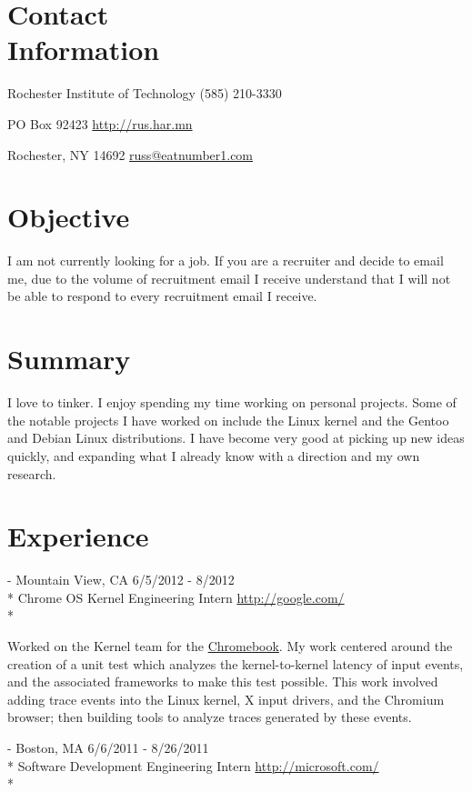 \documentclass[a4paper,margin,line]{resume}
\newcommand{\rurl}[1]{\hfill {\footnotesize \url{#1}}}
\newcommand{\rdate}[1]{\hfill {\small #1}}
\renewcommand{\employer}[5]{\item[#1] - #2 \rdate{#3} \\* #4 \rurl{#5} \\*}
\begin{document}
\begin{resume}
\section{\mysidestyle Contact \\ Information} \vspace{2mm}
	\begin{asparablank}
		\item Rochester Institute of Technology \hfill (585) 210-3330
		\item PO Box 92423 \hfill \href{http://rus.har.mn/}{http://rus.har.mn}
		\item Rochester, NY 14692 \hfill \href{mailto:russ@eatnumber1.com}{russ@eatnumber1.com}
	\end{asparablank}

\section{\mysidestyle Objective}
	I am not currently looking for a job. If you are a recruiter and decide to email me, due to the volume of recruitment email I receive understand that I will not be able to respond to every recruitment email I receive.

\section{\mysidestyle Summary}
	I love to tinker. I enjoy spending my time working on personal projects.
	Some of the notable projects I have worked on include the Linux kernel and
	the Gentoo and Debian Linux distributions.  I have become very good at
	picking up new ideas quickly, and expanding what I already know with a
	direction and my own research.

\section{\mysidestyle Experience}
	\begin{asparadesc}
		\employer{Google}{Mountain View, CA}{6/5/2012 - 8/2012}{Chrome OS Kernel Engineering Intern}{http://google.com/}

		\small
		Worked on the Kernel team for the \href{http://www.google.com/intl/en/chrome/devices/}{Chromebook}. My work centered around the creation of a unit test which analyzes the kernel-to-kernel latency of input events, and the associated frameworks to make this test possible. This work involved adding trace events into the Linux kernel, X input drivers, and the Chromium browser; then building tools to analyze traces generated by these events.
		\normalsize
		\\
		\employer{Microsoft}{Boston, MA}{6/6/2011 - 8/26/2011}{Software Development Engineering Intern}{http://microsoft.com/}


\end{asparadesc}
\end{resume}
\end{document}
